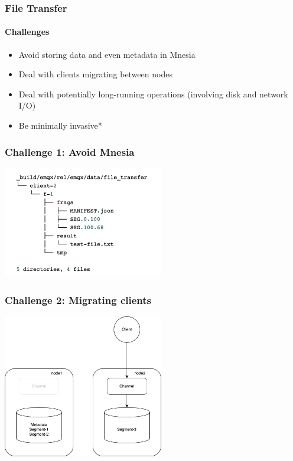 \documentclass{beamer}
\begin{document}
\begin{frame}
    \frametitle{File Transfer}
    \framesubtitle{Challenges}

    \begin{center}
        \begin{itemize}
            \item Avoid storing data and even metadata in Mnesia
            \item Deal with clients migrating between nodes
            \item Deal with potentially long-running operations (involving disk and network I/O)
            \item Be minimally invasive*
        \end{itemize}
    \end{center}
\end{frame}

\begin{frame}
    \frametitle{Challenge 1: Avoid Mnesia}

    \begin{center}
        \includegraphics[width=7cm, keepaspectratio]{images/fs-structure.png}
    \end{center}
\end{frame}

\begin{frame}
    \frametitle{Challenge 2: Migrating clients}

    \begin{center}
        \includegraphics[width=7cm, keepaspectratio]{images/migrating-client.png}
    \end{center}
\end{frame}
\end{document}
